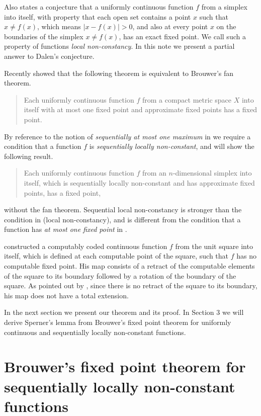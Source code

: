 \documentclass[reqno]{amsart}
\begin{document}
Also \cite{da} states a conjecture that a uniformly continuous function $f$ from a simplex into itself, with property that each open set contains a point $x$ such that $x\neq f(x)$, which means $|x-f(x)|>0$, and also at every point $x$ on the boundaries of the simplex $x\neq f(x)$, has an exact fixed point. We call such a property of functions \emph{local non-constancy}. In this note we present a partial answer to Dalen's conjecture.

 Recently \cite{berger} showed that the following theorem is equivalent to Brouwer's fan theorem.
\begin{quote}
Each uniformly continuous function $f$ from a compact metric space $X$ into itself with at most one fixed point and approximate fixed points has a fixed point.
\end{quote}
\clearpage
By reference to the notion of \emph{sequentially at most one maximum} in \cite{berg} we require a condition that a function $f$ is \emph{sequentially locally non-constant}, and will show the following result.
\begin{quote}
Each uniformly continuous function $f$ from an $n$-dimensional simplex into itself, which is sequentially locally non-constant and has approximate fixed points, has a fixed point,
\end{quote}
\noindent without the fan theorem. Sequential local non-constancy is stronger than the condition in \cite{da} (local non-constancy), and is different from the condition that a function has \emph{at most one fixed point} in \cite{berg}.

\cite{orevkov} constructed a computably coded continuous function $f$ from the unit square into itself, which is defined at each computable point of the square, such that $f$ has no computable fixed point. His map consists of a retract of the computable elements of the square to its boundary followed by a rotation of the boundary of the square. As pointed out by \cite{hirst}, since there is no retract of the square to its boundary, his map does not have a total extension.

In the next section we present our theorem and its proof. In Section 3 we will derive Sperner's lemma from Brouwer's fixed point theorem for uniformly continuous and sequentially locally non-constant functions.

\section{Brouwer's fixed point theorem for sequentially locally non-constant functions}
\end{document}
